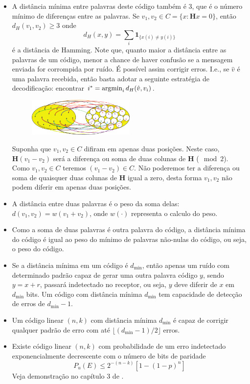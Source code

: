 \begin{frame}[allowframebreaks]
\begin{itemize}
\begin{itemize}
	\end{itemize}
  \item A distância mínima entre palavras deste código também é 3, que é o número mínimo de diferenças entre as palavras.
  	Se $v_1, v_2 \in C = \{ x: \mathbf{H} x = 0 \}$, então $d_H (v_1, v_2) \geq 3$ onde
		\begin{equation}
		d_H(x,y) = \sum_i \mathbf{1}_{\{x(i) \neq y(i)\}}
		\end{equation}
	é a distância de Hamming. Note que, quanto maior a distância entre as palavras de um código, menor a chance
	de haver confusão se a mensagem enviada for corrompida por ruído. É possível assim corrigir erros. I.e.,
	se $\hat{v}$ é uma palavra recebida, então basta adotar a seguinte estratégia de decodificação:
	encontrar $i^\ast = \operatorname*{\arg\!\min}_i d_H(\hat{v},v_i)$.
                \begin{figure}[h!]
                \centering
                \includegraphics[width=0.5\textwidth]{images/binpack.pdf}
                \label{fig:binpack2}
                \end{figure}
  	Suponha que $v_1, v_2 \in C$ difiram em apenas duas posições. Neste caso, $\mathbf{H} (v_1 - v_2)$
	será a diferença ou soma de duas colunas de $\mathbf{H}$ ($\mod 2$). Como $v_1, v_2 \in C$ 
	teremos $(v_1 - v_2) \in C$. Não poderemos ter a diferença ou soma de quaisquer duas colunas de $\mathbf{H}$
	igual a zero, desta forma $v_1,v_2$ não podem diferir em apenas duas posições.
  \item A distância entre duas palavras é o peso da soma delas: $d(v_1,v_2) = w(v_1 + v_2)$, onde $w(\cdot)$ representa o calculo do peso.
  \item Como a soma de duas palavras é outra palavra do código, a distância mínima do código é igual ao peso do mínimo de palavras não-nulas do código, ou seja, o peso do código.
  \item Se a distância mínima em um código é $d_{\text{min}}$, então apenas um ruído com determinado padrão 
    capaz de gerar uma outra palavra código $y$, sendo $y=x+r$, passará indetectado no receptor, ou seja, 
    $y$ deve diferir de $x$ em $d_{\text{min}}$ bits. Um código com distância mínima $d_{\text{min}}$ tem 
    capacidade de detecção de erros de $d_{\text{min}}-1$.
  \item Um código linear $(n,k)$ com distância mínima $d_{\text{min}}$ é capaz de corrigir qualquer padrão de erro
    com até $\lfloor (d_{\text{min}} - 1) / 2 \rfloor$ erros.
  \item Existe código linear $(n,k)$ com probabilidade de um erro indetectado exponencialmente decrescente com o número de bits de paridade
    \begin{equation}
      P_u(E) \leq 2^{-(n-k)} [1 - (1-p)^n]
    \end{equation}
    Veja demonstração no capítulo 3 de \citet{costello2004}.
  \end{itemize}
\end{frame}
